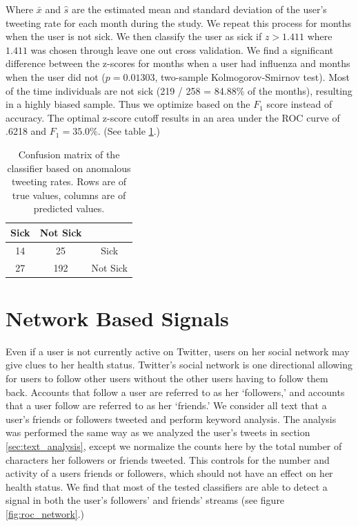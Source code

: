 \documentclass{acm_proc_article-sp}
\begin{document}
Where \(\bar{x}\) and \(\hat{s}\) are the estimated mean and standard deviation of the user's tweeting rate for each month during the study. \cite{Grubs:1969ab} We repeat this process for months when the user is not sick. We then classify the user as sick if \(z > 1.411\) where \(1.411\) was chosen through leave one out cross validation. We find a significant difference between the z-scores for months when a user had influenza and months when the user did not (\(p = 0.01303\), two-sample Kolmogorov-Smirnov test). Most of the time individuals are not sick (219 / 258 = 84.88\% of the months), resulting in a highly biased sample. Thus we optimize based on the \(F_1\) score instead of accuracy. The optimal z-score cutoff results in  an area under the ROC curve of .6218 and \(F_1= 35.0\%\). (See table \ref{tab:tweet_anomaly_confusion}.) 


\begin{table}[h]
\centering
\begin{tabular}{|c|c|c|} \hline
Sick&Not Sick&\ \\ \hline
14 & 25 & Sick\\ \hline
27 & 192 & Not Sick\\
\hline\end{tabular}
\caption{Confusion matrix of the classifier based on anomalous tweeting rates. Rows are of true values, columns are of predicted values.}
\label{tab:tweet_anomaly_confusion}
\end{table}

\section{Network Based Signals}

Even if a user is not currently active on Twitter, users on her social network may give clues to her health status. Twitter's social network is one directional allowing for users to follow other users without the other users having to follow them back. Accounts that follow a user are referred to as her `followers,' and accounts that a user follow are referred to as her `friends.' We consider all text that a user's friends or followers tweeted and perform keyword analysis. The analysis was performed the same way as we analyzed the user's tweets in section \ref{sec:text_analysis}, except we normalize the counts here by the total number of characters her followers or friends tweeted. This controls for the number and activity of a users friends or followers, which should not have an effect on her health status. We find that most of the tested classifiers are able to detect a signal in both the user's followers' and friends' streams (see figure \ref{fig:roc_network}.)
\end{document}
